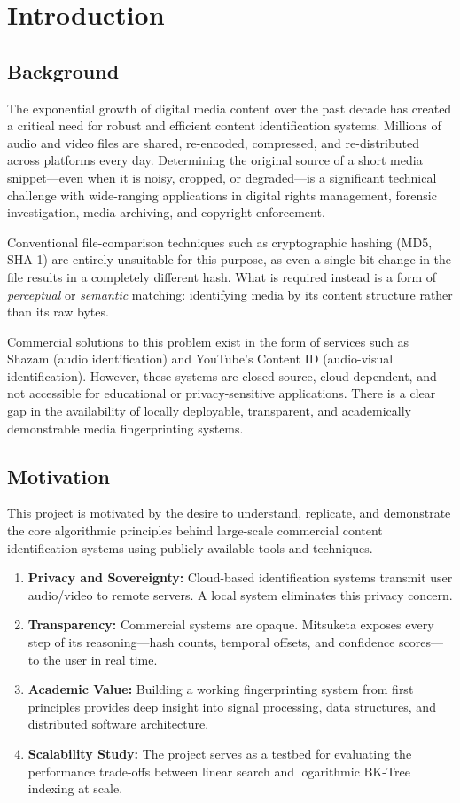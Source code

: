 \newpage
\chapter{Introduction}

\section{Background}
The exponential growth of digital media content over the past decade has created a critical need for robust and efficient content identification systems. Millions of audio and video files are shared, re-encoded, compressed, and re-distributed across platforms every day. Determining the original source of a short media snippet---even when it is noisy, cropped, or degraded---is a significant technical challenge with wide-ranging applications in digital rights management, forensic investigation, media archiving, and copyright enforcement.

Conventional file-comparison techniques such as cryptographic hashing (MD5, SHA-1) are entirely unsuitable for this purpose, as even a single-bit change in the file results in a completely different hash. What is required instead is a form of \textit{perceptual} or \textit{semantic} matching: identifying media by its content structure rather than its raw bytes.

Commercial solutions to this problem exist in the form of services such as Shazam (audio identification) and YouTube's Content ID (audio-visual identification). However, these systems are closed-source, cloud-dependent, and not accessible for educational or privacy-sensitive applications. There is a clear gap in the availability of locally deployable, transparent, and academically demonstrable media fingerprinting systems.

\section{Motivation}
This project is motivated by the desire to understand, replicate, and demonstrate the core algorithmic principles behind large-scale commercial content identification systems using publicly available tools and techniques.

\begin{enumerate}
  \item \textbf{Privacy and Sovereignty:} Cloud-based identification systems transmit user audio/video to remote servers. A local system eliminates this privacy concern.
  \item \textbf{Transparency:} Commercial systems are opaque. Mitsuketa exposes every step of its reasoning---hash counts, temporal offsets, and confidence scores---to the user in real time.
  \item \textbf{Academic Value:} Building a working fingerprinting system from first principles provides deep insight into signal processing, data structures, and distributed software architecture.
  \item \textbf{Scalability Study:} The project serves as a testbed for evaluating the performance trade-offs between linear search and logarithmic BK-Tree indexing at scale.
\end{enumerate}

